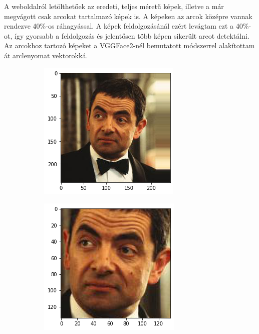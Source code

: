 A weboldalról letölthetőek az eredeti, teljes méretű képek, illetve a már megvágott csak arcokat tartalmazó képek is. A képeken az arcok középre vannak rendezve 40\%-os ráhagyással. A képek feldolgozásánál ezért levágtam ezt a 40\%-ot, így gyorsabb a feldolgozás és jelentősen több képen sikerült arcot detektálni. Az arcokhoz tartozó képeket a VGGFace2-nél bemutatott módszerrel alakítottam át arclenyomat vektorokká.

\begin{figure}[ht]
     \centering
     \begin{subfigure}[b]{0.45\columnwidth}
         \centering
         \includegraphics[width=1\columnwidth]{figures/mrbean.png}
     \end{subfigure}
     \begin{subfigure}[b]{0.45\columnwidth}
         \centering
         \includegraphics[width=1\columnwidth]{figures/mrbean_crop.png}

\end{subfigure}
\end{figure}
